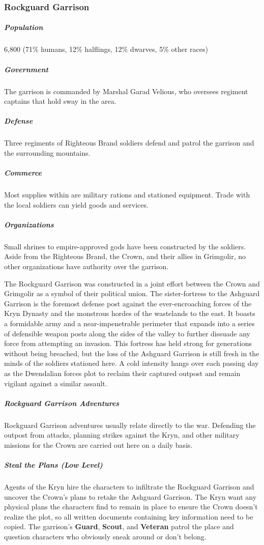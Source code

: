 \documentclass[10pt,a4paper,twoside,bg=print,twocolumn,openany,nodeprecatedcode]{dndbook}
\begin{document}
\subsubsection{Rockguard Garrison}
\subparagraph{Population}
6,800 (71\% humans, 12\% halflings, 12\% dwarves, 5\% other races)

\subparagraph{Government}
The garrison is commanded by Marshal Garad Velious, who oversees regiment captains that hold sway in the area.

\subparagraph{Defense}
Three regiments of Righteous Brand soldiers defend and patrol the garrison and the surrounding mountains.

\subparagraph{Commerce}
Most supplies within are military rations and stationed equipment. Trade with the local soldiers can yield goods and services.

\subparagraph{Organizations}
Small shrines to empire-approved gods have been constructed by the soldiers. Aside from the Righteous Brand, the Crown, and their allies in Grimgolir, no other organizations have authority over the garrison.

The Rockguard Garrison was constructed in a joint effort between the Crown and Grimgolir as a symbol of their political union. The sister-fortress to the Ashguard Garrison is the foremost defense post against the ever-encroaching forces of the Kryn Dynasty and the monstrous hordes of the wastelands to the east. It boasts a formidable army and a near-impenetrable perimeter that expands into a series of defensible weapon posts along the sides of the valley to further dissuade any force from attempting an invasion. This fortress has held strong for generations without being breached, but the loss of the Ashguard Garrison is still fresh in the minds of the soldiers stationed here. A cold intensity hangs over each passing day as the Dwendalian forces plot to reclaim their captured outpost and remain vigilant against a similar assault.

\subparagraph{Rockguard Garrison Adventures}
Rockguard Garrison adventures usually relate directly to the war. Defending the outpost from attacks, planning strikes against the Kryn, and other military missions for the Crown are carried out here on a daily basis.

\subparagraph{Steal the Plans (Low Level)}
Agents of the Kryn hire the characters to infiltrate the Rockguard Garrison and uncover the Crown's plans to retake the Ashguard Garrison. The Kryn want any physical plans the characters find to remain in place to ensure the Crown doesn't realize the plot, so all written documents containing key information need to be copied. The garrison's \textbf{Guard}, \textbf{Scout}, and \textbf{Veteran} patrol the place and question characters who obviously sneak around or don't belong.
\end{document}
